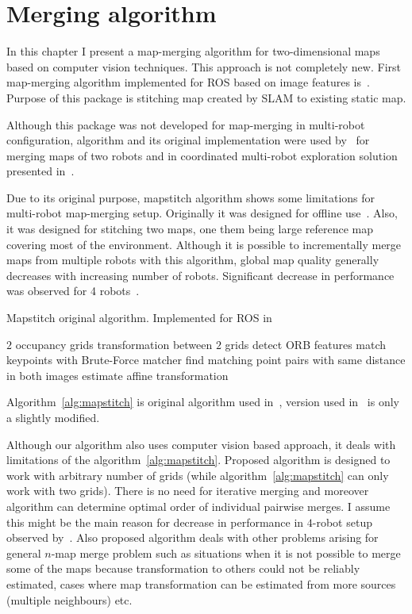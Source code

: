 \chapter{Merging algorithm}
\label{chap:mergingalgorithm}

In this chapter I present a map-merging algorithm for two-dimensional maps based on computer vision techniques. This approach is not completely new. First map-merging algorithm implemented for \gls{ROS} based on image features is~\cite{MapstitchROS}. Purpose of this package is stitching map created by \gls{SLAM} to existing static map.

Although this package was not developed for map-merging in multi-robot configuration, algorithm and its original implementation were used by~\cite{martins2013mrslam} for merging maps of two robots and in coordinated multi-robot exploration solution presented in~\cite{Andre2014}.

Due to its original purpose, mapstitch algorithm shows some limitations for multi-robot map-merging setup. Originally it was designed for offline use~\cite{Andre2014}. Also, it was designed for stitching two maps, one them being large reference map covering most of the environment. Although it is possible to incrementally merge maps from multiple robots with this algorithm, global map quality generally decreases with increasing number of robots. Significant decrease in performance was observed for 4 robots~\cite{Andre2014}.

\begin{algorithm}
    \caption[Mapstitch algorithm.]{Mapstitch original algorithm. Implemented for \gls{ROS} in~\cite{MapstitchROS}}
    \label{alg:mapstitch}
    \begin{algorithmic}[1]
        \Require $2$ occupancy grids
        \Ensure transformation between $2$ grids
            \State detect \gls{ORB} features
            \State match keypoints with Brute-Force matcher
            \State find matching point pairs with same distance in both images
            \State estimate affine transformation
        \EndProcedure
    \end{algorithmic}
\end{algorithm}

Algorithm~\ref{alg:mapstitch} is original algorithm used in~\cite{MapstitchROS}, version used in~\cite{Andre2014} is only a slightly modified.

Although our algorithm also uses computer vision based approach, it deals with limitations of the algorithm~\ref{alg:mapstitch}. Proposed algorithm is designed to work with arbitrary number of grids (while algorithm~\ref{alg:mapstitch} can only work with two grids). There is no need for iterative merging and moreover algorithm can determine optimal order of individual pairwise merges. I assume this might be the main reason for decrease in performance in $4$-robot setup observed by~\cite{Andre2014}. Also proposed algorithm deals with other problems arising for general $n$-map merge problem such as situations when it is not possible to merge some of the maps because transformation to others could not be reliably estimated, cases where map transformation can be estimated from more sources (multiple neighbours) etc.

